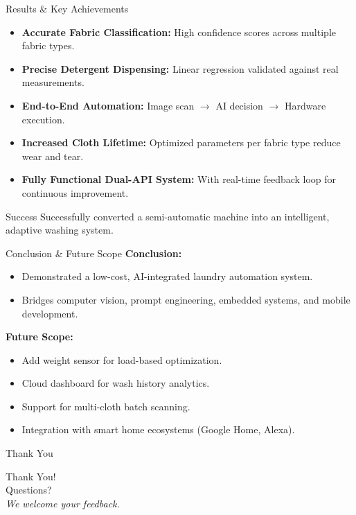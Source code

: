 \documentclass[aspectratio=169]{beamer}
\begin{document}
\begin{frame}{Results \& Key Achievements}
\begin{itemize}
    \item \textbf{Accurate Fabric Classification:} High confidence scores across multiple fabric types.
    \item \textbf{Precise Detergent Dispensing:} Linear regression validated against real measurements.
    \item \textbf{End-to-End Automation:} Image scan $\rightarrow$ AI decision $\rightarrow$ Hardware execution.
    \item \textbf{Increased Cloth Lifetime:} Optimized parameters per fabric type reduce wear and tear.
    \item \textbf{Fully Functional Dual-API System:} With real-time feedback loop for continuous improvement.
\end{itemize}
\vspace{0.3cm}
\begin{exampleblock}{Success}
\centering Successfully converted a semi-automatic machine into an intelligent, adaptive washing system.
\end{exampleblock}
\end{frame}

\begin{frame}{Conclusion \& Future Scope}
\textbf{Conclusion:}
\begin{itemize}
    \item Demonstrated a low-cost, AI-integrated laundry automation system.
    \item Bridges computer vision, prompt engineering, embedded systems, and mobile development.
\end{itemize}
\vspace{0.3cm}
\textbf{Future Scope:}
\begin{itemize}
    \item Add weight sensor for load-based optimization.
    \item Cloud dashboard for wash history analytics.
    \item Support for multi-cloth batch scanning.
    \item Integration with smart home ecosystems (Google Home, Alexa).
\end{itemize}
\end{frame}

\begin{frame}{Thank You}
\begin{center}
\Huge Thank You! \\[1cm]
\Large Questions? \\[0.5cm]
\small \emph{We welcome your feedback.}
\end{center}
\end{frame}
\end{document}
